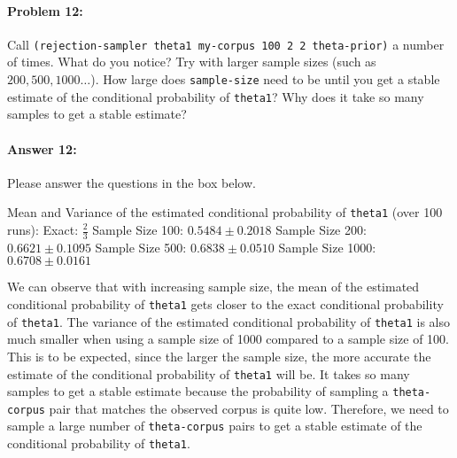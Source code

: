 \documentclass[10pt]{article}
\newenvironment{AnswerBox}{\begin{mdframed}[style=simple]}{\end{mdframed}}
\begin{document}
\hrulefill %

\paragraph{Problem 12:}

Call \texttt{(rejection-sampler theta1 my-corpus 100 2 2 theta-prior)}
a number of times. What do you notice? Try with larger sample sizes
(such as $200, 500, 1000\ldots$). How large does
\texttt{sample-size} need to be until you get a stable estimate of the
conditional probability of \texttt{theta1}? Why does it take so many
samples to get a stable estimate?

\paragraph{Answer 12:} Please answer the questions in the box below.

\begin{AnswerBox}%

    Mean and Variance of the estimated conditional probability of \texttt{theta1} (over 100 runs):\newline
    Exact: $\frac{2}{3}$\newline
    Sample Size 100: $0.5484 \pm 0.2018$\newline
    Sample Size 200: $0.6621 \pm 0.1095$\newline
    Sample Size 500: $0.6838 \pm 0.0510$\newline
    Sample Size 1000: $0.6708 \pm 0.0161$\newline

    We can observe that with increasing sample size, the mean of the estimated conditional probability of \texttt{theta1} gets closer to the exact conditional probability of \texttt{theta1}. The variance of the estimated conditional probability of \texttt{theta1} is also much smaller when using a sample size of 1000 compared to a sample size of 100. This is to be expected, since the larger the sample size, the more accurate the estimate of the conditional probability of \texttt{theta1} will be. It takes so many samples to get a stable estimate because the probability of sampling a \texttt{theta-corpus} pair that matches the observed corpus is quite low. Therefore, we need to sample a large number of \texttt{theta-corpus} pairs to get a stable estimate of the conditional probability of \texttt{theta1}.
    
\end{AnswerBox}%
\end{document}
